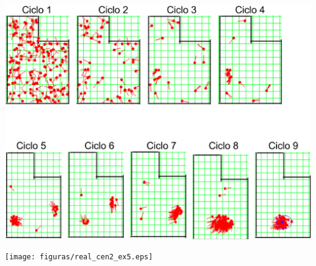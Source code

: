 {\centering
\includegraphics[scale=0.4]{figuras/cen2_ex5.eps}
\label{img:cen2_ex5}
\par}

{\centering
\texttt{[image: figuras/real\_cen2\_ex5.eps]}
\label{img:real_cen2_ex5}
\par}
